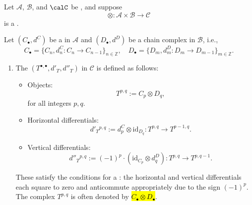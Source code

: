 \begin{definition} \label{definition:tensor_product_of_chain_complexes_of_objects_of_additive_categories_with_an_additive_bifunctor}
Let $\mathcal{A}$, $\mathcal{B}$, and $\calC$ be , and suppose
$$ \otimes : \mathcal{A} \times \mathcal{B} \to \mathcal{C} $$
is a .

Let $(C_\bullet, d^C)$ be a  in $\mathcal{A}$ and $(D_\bullet, d^D)$ be a chain complex in $\mathcal{B}$, i.e.,
$$ C_\bullet = \{ C_n, d^C_n : C_n \to C_{n-1} \}_{n \in \mathbb{Z}}, \quad D_\bullet = \{ D_m, d^D_m : D_m \to D_{m-1} \}_{m \in \mathbb{Z}}.  $$

\begin{enumerate}
    \item The  $(T^{\bullet, \bullet}, d'_T, d''_T)$ in $\mathcal{C}$ is defined as follows:
    \begin{itemize}
    \item Objects:
    $$
    T^{p,q} := C_p \otimes D_q,
    $$
    for all integers $p,q$.
    \item Horizontal differentials:
    $$
    d'_T{}^{p,q} := d^C_p \otimes \mathrm{id}_{D_q} : T^{p,q} \to T^{p-1,q}.
    $$
    \item Vertical differentials:
    $$
    d''_T{}^{p,q} := (-1)^p \cdot (\mathrm{id}_{C_p} \otimes d^D_q) : T^{p,q} \to T^{p,q-1}.
    $$
    \end{itemize}
    These satisfy the conditions for a : the horizontal and vertical differentials each square to zero and anticommute appropriately due to the sign $(-1)^p$. The complex $T^{p,q}$ is often denoted by \hl{$C_\bullet \otimes D_\bullet$}.


\end{enumerate}
\end{definition}
